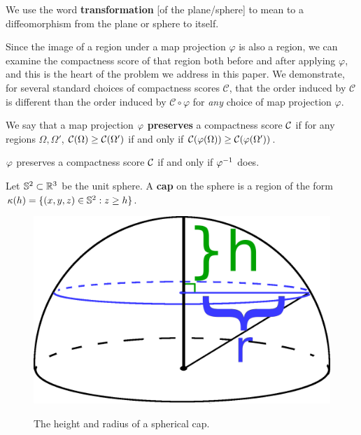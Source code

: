 \begin{definition}
  We use the word \textbf{transformation} [of the plane/sphere] to mean
  to a diffeomorphism from the plane or sphere to itself.
\end{definition}
Since the image of a region under a map projection $\varphi$ is also
a region, we can examine the compactness score of that region both 
before and after applying $\varphi$, and this is the heart of the
problem we address in this paper.  We demonstrate, for several
standard choices of compactness scores $\mathcal{C}$, that the order
induced by $\mathcal{C}$ is different than the order induced by
$\mathcal{C}\circ\varphi$ for \textit{any} choice of map projection
$\varphi$.

\begin{definition}
  We say that a map projection $\varphi$ \textbf{preserves} a 
  compactness score $\mathcal{C}$ if for any regions 
  $\Omega,\Omega'$, $\mathcal{C}(\Omega)\ge \mathcal{C}(\Omega')$ 
  if and only if $\mathcal{C}(\varphi(\Omega)) \ge \mathcal{C}(\varphi(\Omega'))$.
\end{definition}
\begin{remark}
  $\varphi$ preserves a compactness score $\mathcal{C}$ 
  if and only if $\varphi^{-1}$ does.
\end{remark}
\begin{definition}
  Let $\mathbb{S}^2\subset \mathbb{R}^3$ be the unit sphere. A 
  \textbf{cap} on the sphere is a region of the 
  form $\kappa(h) = \{(x,y,z)\in \mathbb{S}^2: z\ge h\}$.
\end{definition}

\begin{figure}
  \centering
  \includegraphics[width=.3\textwidth]{figs/spherecapschema}\\[1.5em]
  \caption{ The height and radius of a spherical cap. }
  \label{fig:caphr}
\end{figure}
